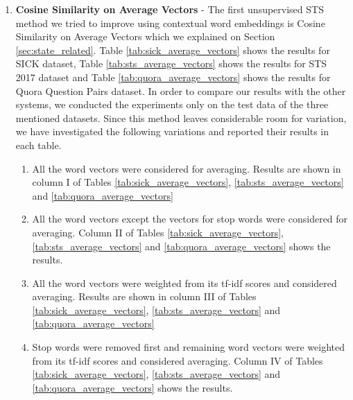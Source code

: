 \begin{enumerate}
	\item \textbf{Cosine Similarity on Average Vectors} - The first unsupervised STS method we tried to improve using contextual word embeddings is Cosine Similarity on Average Vectors which we explained on Section \ref{sec:state_related}. Table \ref{tab:sick_average_vectors} shows the results for SICK dataset, Table \ref{tab:sts_average_vectors} shows the results for STS 2017 dataset and Table \ref{tab:quora_average_vectors} shows the results for Quora Question Pairs dataset. In order to compare our results with the other systems, we conducted the experiments only on the test data of the three mentioned datasets. Since this method leaves considerable room for variation, we have investigated the following variations and reported their results in each table. 
	
	\begin{enumerate}
		\item All the word vectors were considered for averaging. Results are shown in column I of Tables \ref{tab:sick_average_vectors}, \ref{tab:sts_average_vectors} and \ref{tab:quora_average_vectors}
		
		\item All the word vectors except the vectors for stop words were considered for averaging. Column II of Tables \ref{tab:sick_average_vectors}, \ref{tab:sts_average_vectors} and \ref{tab:quora_average_vectors} shows the results. 
		
		\item All the word vectors were weighted from its tf-idf scores and considered averaging. Results are shown in column III of Tables \ref{tab:sick_average_vectors}, \ref{tab:sts_average_vectors} and \ref{tab:quora_average_vectors}
		
		\item Stop words were removed first and remaining word vectors were weighted from its tf-idf scores and considered averaging. Column IV of Tables \ref{tab:sick_average_vectors}, \ref{tab:sts_average_vectors} and \ref{tab:quora_average_vectors} shows the results.  
		
	\end{enumerate}
	
\begin{table}[htb]
	\centering
\end{table}
\end{enumerate}

